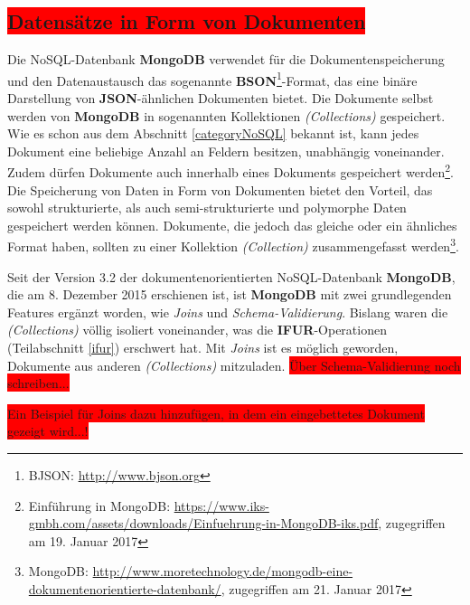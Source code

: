 \subsection{\colorbox{red}{Datensätze in Form von Dokumenten}}
Die NoSQL-Datenbank \textbf{MongoDB} verwendet für die Dokumentenspeicherung und den Datenaustausch das sogenannte \textbf{BSON}\footnote{BJSON: \url{http://www.bjson.org}}-Format, das eine binäre Darstellung von \textbf{JSON}-ähnlichen Dokumenten bietet.
Die Dokumente selbst werden von \textbf{MongoDB} in sogenannten Kollektionen \textit{(Collections)} gespeichert. Wie es schon aus dem Abschnitt \ref{categoryNoSQL} bekannt ist, kann jedes Dokument eine beliebige Anzahl an Feldern besitzen, unabhängig voneinander. Zudem dürfen Dokumente auch innerhalb eines Dokuments gespeichert werden\footnote{Einführung in MongoDB: \url{https://www.iks-gmbh.com/assets/downloads/Einfuehrung-in-MongoDB-iks.pdf}, zugegriffen am 19. Januar 2017}. Die Speicherung von Daten in Form von Dokumenten bietet den Vorteil, das sowohl strukturierte, als auch semi-strukturierte und polymorphe Daten gespeichert werden können. Dokumente, die jedoch das gleiche oder ein ähnliches Format haben, sollten zu einer Kollektion \textit{(Collection)} zusammengefasst werden\footnote{MongoDB: \url{http://www.moretechnology.de/mongodb-eine-dokumentenorientierte-datenbank/}, zugegriffen am 21. Januar 2017}.

Seit der Version 3.2 der dokumentenorientierten NoSQL-Datenbank \textbf{MongoDB}, die am 8. Dezember 2015 erschienen ist, ist \textbf{MongoDB}  mit zwei grundlegenden Features ergänzt worden, wie \textit{Joins} und \textit{Schema-Validierung}. Bislang waren die \textit{(Collections)} völlig isoliert voneinander, was die \textbf{IFUR}-Operationen (Teilabschnitt \ref{ifur}) erschwert hat. Mit \textit{Joins} ist es möglich geworden, Dokumente aus anderen \textit{(Collections)} mitzuladen.
\colorbox{red}{Über Schema-Validierung noch schreiben...}

\colorbox{red}{Ein Beispiel für Joins dazu hinzufügen, in dem ein eingebettetes Dokument gezeigt wird...!}

